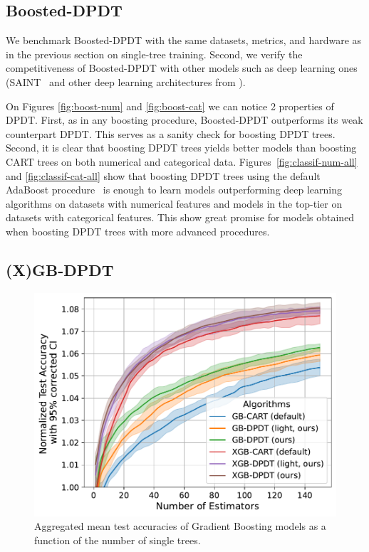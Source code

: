 \subsection{Boosted-DPDT}\label{sec:boosting}

We benchmark Boosted-DPDT with the same datasets, metrics, and hardware as in the previous section on single-tree training. Second, we verify the competitiveness of Boosted-DPDT with other models such as deep learning ones (SAINT~\cite{somepalli2021saintimprovedneuralnetworks} and other deep learning architectures from \cite{resnet}). 

On Figures \ref{fig:boost-num} and \ref{fig:boost-cat} we can notice 2 properties of DPDT. First, as in any boosting procedure, Boosted-DPDT outperforms its weak counterpart DPDT. This serves as a sanity check for boosting DPDT trees. Second, it is clear that boosting DPDT trees yields better models than boosting CART trees on both numerical and categorical data. Figures~\ref{fig:classif-num-all} and \ref{fig:classif-cat-all} show that boosting DPDT trees using the default AdaBoost procedure~\cite{FREUND1997119} is enough to learn models outperforming deep learning algorithms on datasets with numerical features and models in the top-tier on datasets with categorical features. This show great promise for models obtained when boosting DPDT trees with more advanced procedures.

\subsection{(X)GB-DPDT}
\begin{figure}
    \centering
    \includegraphics[trim={0 0 0 0},clip,width=0.8\linewidth]{images/figures/xgboosting_normalized_wo_opt.pdf}
    \caption{Aggregated mean test accuracies of Gradient Boosting models as a function of the number of single trees.}
    \label{fig:gb}
\end{figure}

